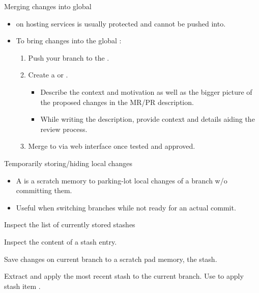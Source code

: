 \begin{frame}{Merging changes into global }
\begin{itemize}
\item {} on hosting services is usually protected and cannot be pushed into.
\item To bring changes into the global :
\begin{enumerate}
\item Push your branch to the .
\item Create a  or .
\begin{itemize}
\item Describe the context and motivation as well as the bigger picture of the proposed changes in the MR/PR description.
\item While writing the description, provide context and details aiding the review process.
\end{itemize}
\item Merge to  via web interface once tested and approved.
\end{enumerate}
\end{itemize}
\end{frame}

\begin{frame}{Temporarily storing/hiding local changes}

\begin{itemize}
\item A  is a scratch memory to parking-lot local changes of a branch w/o committing them.
\item Useful when switching branches while not ready for an actual commit.
\end{itemize}
\begin{block}{}
Inspect the list of currently stored stashes
\end{block}
\begin{block}{}
Inspect the content of a stash entry.
\end{block}
\begin{block}{}
Save changes on current branch to a scratch pad memory, {\ie} the stash.
\end{block}
\begin{block}{}
Extract and apply the most recent stash to the current branch.
Use  to apply stash item .
\end{block}
\end{frame}

